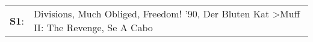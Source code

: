 \begin{supertabular}{p{0.03\textwidth}p{0.92\textwidth}}
 \textbf{S1}:  &  Divisions\textsuperscript{}, \enspace Much Obliged\textsuperscript{}, \enspace Freedom! '90\textsuperscript{}, \enspace Der Bluten Kat\textsuperscript{} \textgreater \enspace Muff II: The Revenge\textsuperscript{}, \enspace Se A Cabo\textsuperscript{}  \enspace  \\
\end{supertabular}

